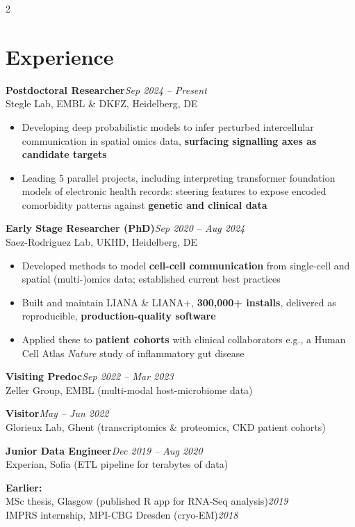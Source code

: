 \documentclass[11pt,a4paper]{article}
\newcommand{\cvrole}[3]{%
  {\bfseries #1}\hfill{\color{softgrey}\itshape #3}\\
  {\color{softgrey}#2}\par\vspace{3pt}}
\newenvironment{cvitems}
  {\begin{itemize}[leftmargin=1.05em,itemsep=3.5pt,parsep=0pt,topsep=3.5pt,label={\color{accent}\small\textbullet}]}
  {\end{itemize}\vspace{7pt}}
\begin{document}
\setlength{\columnsep}{20pt}
\begin{paracol}{2}

\section{Experience}

\cvrole{Postdoctoral Researcher}{Stegle Lab, EMBL \& DKFZ, Heidelberg, DE}{Sep 2024 -- Present}
\begin{cvitems}
  \item Developing deep probabilistic models to infer perturbed
        intercellular communication in spatial omics data, \textbf{surfacing signalling axes
        as candidate targets}
  \item Leading 5 parallel projects, including interpreting transformer
        foundation models of electronic health records: steering features to expose
        encoded comorbidity patterns against \textbf{genetic and clinical data}
\end{cvitems}

\cvrole{Early Stage Researcher (PhD)}{Saez-Rodriguez Lab, UKHD, Heidelberg, DE}{Sep 2020 -- Aug 2024}
\begin{cvitems}
  \item Developed methods to model \textbf{cell-cell communication} from single-cell and
        spatial (multi-)omics data; established current best practices
  \item Built and maintain LIANA \& LIANA+, \textbf{300,000+ installs},
        delivered as reproducible, \textbf{production-quality software}
  \item Applied these to \textbf{patient cohorts} with clinical collaborators e.g., a Human Cell Atlas \textit{Nature} study of
        inflammatory gut disease
\end{cvitems}

\cvrole{Visiting Predoc}{Zeller Group, EMBL (multi-modal host-microbiome data)}{Sep 2022 -- Mar 2023}
\vspace{4pt}
\cvrole{Visitor}{Glorieux Lab, Ghent (transcriptomics \& proteomics, CKD patient cohorts)}{May -- Jun 2022}
\vspace{4pt}
\cvrole{Junior Data Engineer}{Experian, Sofia (ETL pipeline for terabytes of data)}{Dec 2019 -- Aug 2020}
\vspace{4pt}
{\color{softgrey}\textbf{Earlier:}\\[1pt]
MSc thesis, Glasgow (published R app for RNA-Seq analysis)\hfill{\itshape 2019}\\[1pt]
IMPRS internship, MPI-CBG Dresden (cryo-EM)\hfill{\itshape 2018}}


\end{paracol}
\end{document}
